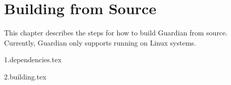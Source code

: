 
\chapter{Building from Source}
{
	This chapter describes the steps for how to build Guardian from source.
	Currently, Guardian only supports running on Linux systems.
	
	{1.dependencies.tex}
	
	{2.building.tex}
}


